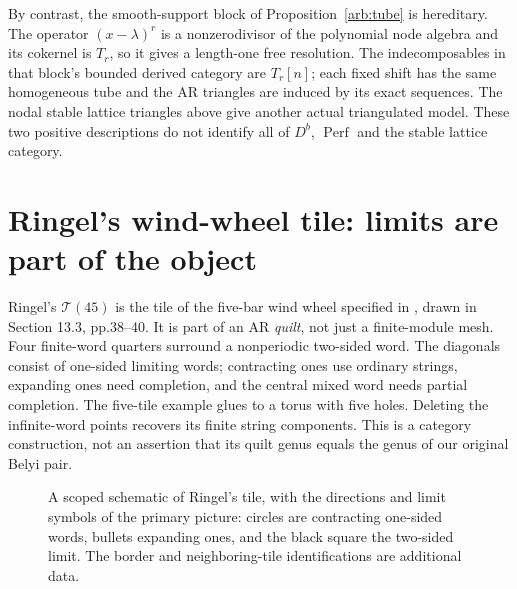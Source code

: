 By contrast, the smooth-support block of Proposition~\ref{arb:tube} is hereditary.
The operator $(x-\lambda)^r$ is a nonzerodivisor of the polynomial node algebra
and its cokernel is $T_r$, so it gives a length-one free resolution. The
indecomposables in that block's bounded derived category are $T_r[n]$; each
fixed shift has the same homogeneous tube and the AR triangles are induced
by its exact sequences. The nodal stable lattice triangles above give another
actual triangulated model. These two positive descriptions do not identify
all of $D^b$, $\operatorname{Perf}$ and the stable lattice category.

\section[Ringel's wind-wheel tile]{Ringel's wind-wheel tile: limits are part of the object}
Ringel's $\mathcal T(45)$ is the tile of the five-bar wind wheel specified in
\cite[Section 12.5, p.30]{ARBRingel}, drawn in Section 13.3, pp.38--40.
It is part of an AR \emph{quilt}, not just a finite-module mesh. Four finite-word
quarters surround a nonperiodic two-sided word. The diagonals consist of
one-sided limiting words; contracting ones use ordinary strings, expanding
ones need completion, and the central mixed word needs partial completion.
The five-tile example glues to a torus with five holes. Deleting the infinite-word
points recovers its finite string components. This is a category construction,
not an assertion that its quilt genus equals the genus of our original Belyi pair.

\begin{figure}[htbp]\centering
{}
\caption{A scoped schematic of Ringel's tile, with the directions and limit
symbols of the primary picture: circles are contracting one-sided words,
bullets expanding ones, and the black square the two-sided limit. The border
and neighboring-tile identifications are additional data.}
\end{figure}


